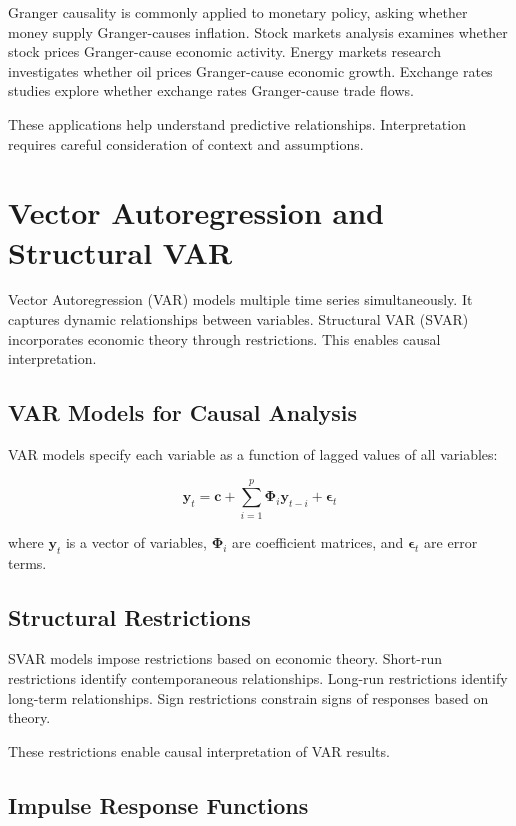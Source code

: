 Granger causality is commonly applied to monetary policy, asking whether money supply Granger-causes inflation. Stock markets analysis examines whether stock prices Granger-cause economic activity. Energy markets research investigates whether oil prices Granger-cause economic growth. Exchange rates studies explore whether exchange rates Granger-cause trade flows.

These applications help understand predictive relationships. Interpretation requires careful consideration of context and assumptions.

\section{Vector Autoregression and Structural VAR}

Vector Autoregression (VAR) models multiple time series simultaneously. It captures dynamic relationships between variables. Structural VAR (SVAR) incorporates economic theory through restrictions. This enables causal interpretation.

\subsection{VAR Models for Causal Analysis}

VAR models specify each variable as a function of lagged values of all variables:

\[
\mathbf{y}_t = \mathbf{c} + \sum_{i=1}^{p} \mathbf{\Phi}_i \mathbf{y}_{t-i} + \boldsymbol{\epsilon}_t
\]

where \(\mathbf{y}_t\) is a vector of variables, \(\mathbf{\Phi}_i\) are coefficient matrices, and \(\boldsymbol{\epsilon}_t\) are error terms.

\subsection{Structural Restrictions}

SVAR models impose restrictions based on economic theory. Short-run restrictions identify contemporaneous relationships. Long-run restrictions identify long-term relationships. Sign restrictions constrain signs of responses based on theory.

These restrictions enable causal interpretation of VAR results.

\subsection{Impulse Response Functions}

